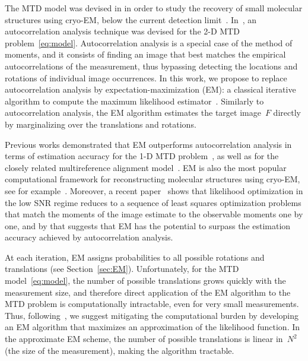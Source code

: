 \documentclass{article}
\begin{document}
The MTD model was devised in \cite{bendory2018toward} in order to study the recovery of small molecular structures using cryo-EM, below the current detection limit~\cite{d2021current}. In~\cite{marshall2020image, bendory2021multi, kreymer2021two}, an autocorrelation analysis technique was devised for the 2-D MTD problem~\eqref{eq:model}. Autocorrelation analysis is a special case of the method of moments, and it consists of finding an image that best matches the empirical autocorrelations of the measurement, thus bypassing detecting the locations and rotations of individual image occurrences. %
In this work, we propose to replace autocorrelation analysis by expectation-maximization (EM): a classical iterative algorithm to compute the  maximum likelihood estimator~\cite{dempster1977maximum}.
Similarly to autocorrelation analysis, the EM algorithm estimates the target image~$F$ directly by marginalizing over the translations and rotations.

Previous works demonstrated that EM outperforms autocorrelation analysis in terms of estimation accuracy for the \mbox{1-D} MTD problem~\cite{lan2020multi}, as well as for the closely related multireference alignment model~\cite{bendory2017bispectrum, abbe2018multireference}. EM is also the most popular computational framework for reconstructing molecular structures using cryo-EM, see for example~\cite{scheres2012relion, punjani2017cryosparc}. Moreover, a recent paper~\cite{katsevich2020likelihood} shows that likelihood optimization in the low SNR regime reduces to a sequence of least squares optimization problems that match the moments of the image estimate to the observable moments one by one, and by that suggests that EM has the potential to surpass the estimation accuracy achieved by autocorrelation analysis.

At each iteration, EM assigns probabilities to all possible rotations and translations (see Section~\ref{sec:EM}). Unfortunately, for the MTD model~\eqref{eq:model}, the number of possible translations grows quickly with the measurement size, and therefore direct application of the EM algorithm to the MTD problem is computationally intractable, even for very small measurements. Thus, following~\cite{lan2020multi}, we suggest mitigating the computational burden by developing an EM algorithm that maximizes an approximation of the likelihood function. In the approximate EM scheme, the number of possible translations is linear in~$N^2$ (the size of the measurement), making the algorithm tractable.
\end{document}
